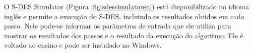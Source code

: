 O S-DES Simulator (Figura \ref{fig:sdessimulatoren}) está disponibilizado no idioma inglês e permite a execução do S-DES, incluindo os resultados obtidos em cada passo. Nele pode-se informar os parâmetros de entrada que ele utiliza para mostrar os resultados dos passos e o resultado da execução do algoritmo. Ele é voltado ao ensino e pode ser instalado no Windows. \cite{permadi18}





